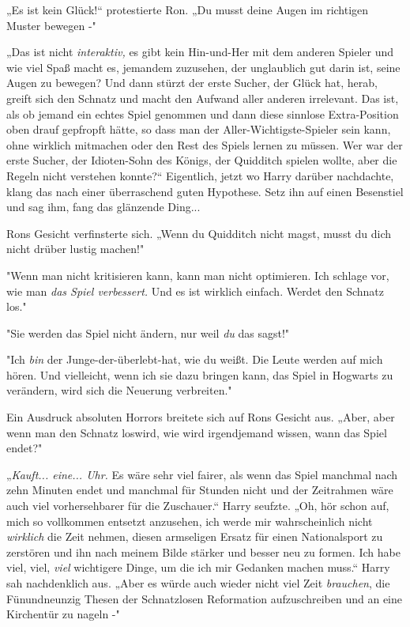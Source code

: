 {„Es ist kein Glück!“ protestierte Ron. „Du musst deine Augen im richtigen Muster bewegen -"

„Das ist nicht \emph{interaktiv,} es gibt kein Hin-und-Her mit dem anderen Spieler und wie viel Spaß macht es, jemandem zuzusehen, der unglaublich gut darin ist, seine Augen zu bewegen? Und dann stürzt der erste Sucher, der Glück hat, herab, greift sich den Schnatz und macht den Aufwand aller anderen irrelevant. Das ist, als ob jemand ein echtes Spiel genommen und dann diese sinnlose Extra-Position oben drauf gepfropft hätte, so dass man der Aller-Wichtigste-Spieler sein kann, ohne wirklich mitmachen oder den Rest des Spiels lernen zu müssen. Wer war der erste Sucher, der Idioten-Sohn des Königs, der Quidditch spielen wollte, aber die Regeln nicht verstehen konnte?“ Eigentlich, jetzt wo Harry darüber nachdachte, klang das nach einer überraschend guten Hypothese. Setz ihn auf einen Besenstiel und sag ihm, fang das glänzende Ding...

Rons Gesicht verfinsterte sich. „Wenn du Quidditch nicht magst, musst du dich nicht drüber lustig machen!"

"Wenn man nicht kritisieren kann, kann man nicht optimieren. Ich schlage vor, wie man \emph{das Spiel verbessert.} Und es ist wirklich einfach. Werdet den Schnatz los."

"Sie werden das Spiel nicht ändern, nur weil \emph{du} das sagst!"

"Ich \emph{bin} der Junge-der-überlebt-hat, wie du weißt. Die Leute werden auf mich hören. Und vielleicht, wenn ich sie dazu bringen kann, das Spiel in Hogwarts zu verändern, wird sich die Neuerung verbreiten."

Ein Ausdruck absoluten Horrors breitete sich auf Rons Gesicht aus. „Aber, aber wenn man den Schnatz loswird, wie wird irgendjemand wissen, wann das Spiel endet?"

„\emph{Kauft... eine... Uhr.} Es wäre sehr viel fairer, als wenn das Spiel manchmal nach zehn Minuten endet und manchmal für Stunden nicht und der Zeitrahmen wäre auch viel vorhersehbarer für die Zuschauer.“ Harry seufzte. „Oh, hör schon auf, mich so vollkommen entsetzt anzusehen, ich werde mir wahrscheinlich nicht \emph{wirklich} die Zeit nehmen, diesen armseligen Ersatz für einen Nationalsport zu zerstören und ihn nach meinem Bilde stärker und besser neu zu formen. Ich habe viel, viel, \emph{viel} wichtigere Dinge, um die ich mir Gedanken machen muss.“ Harry sah nachdenklich aus. „Aber es würde auch wieder nicht viel Zeit \emph{brauchen}, die Fünundneunzig Thesen der Schnatzlosen Reformation aufzuschreiben und an eine Kirchentür zu nageln -"

}
